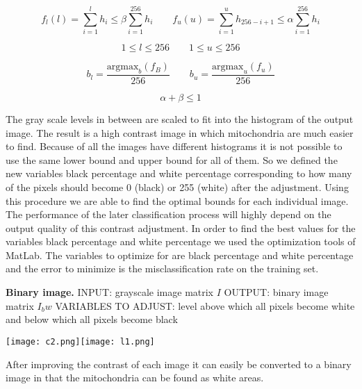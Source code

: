 \documentclass[a4paper, 11pt]{article}
\begin{document}
\begin{equation}
	f_l(l)=\sum_{i=1}^{l}h_i\leq\beta\sum_{i=1}^{256}h_i \qquad f_u(u)=\sum_{i=1}^{u}h_{256-i+1}\leq\alpha\sum_{i=1}^{256}h_i
\end{equation}

\begin{equation}
	1 \leq l \leq 256 \qquad 1 \leq u \leq 256
\end{equation}

\begin{equation}
	b_l=\frac{\mbox{argmax}_b(f_B)}{256} \qquad b_u=\frac{\mbox{argmax}_u(f_u)}{256}
\end{equation}

\begin{equation}
	\alpha + \beta \leq 1
\end{equation}

The gray scale levels in between are scaled to fit into the histogram of the output image. The result is a high contrast image in which mitochondria are much easier to find.
Because of all the images have different histograms it is not possible to use the same lower bound and upper bound for all of them. So we defined the new variables black percentage and white percentage corresponding to how many of the pixels should become 0 (black) or 255 (white) after the adjustment. Using this procedure we are able to find the optimal bounds for each individual image. The performance of the later classification process will highly depend on the output quality of this contrast adjustment. In order to find the best values for the variables black percentage and white percentage we used the optimization tools of MatLab. The variables to optimize for are black percentage and white percentage and the error to minimize is the misclassification rate on the training set. 
\newline
\newline

\textbf{Binary image.} 
\newline
\newline
INPUT: grayscale image matrix $I$
\newline
OUTPUT: binary image matrix $I_bw$
\newline
VARIABLES TO ADJUST: level above which all pixels become white and below which all pixels become black
\newline
\newline
\begin{center}\texttt{[image: c2.png]}\texttt{[image: l1.png]}
\end{center}
After improving the contrast of each image it can easily be converted to a binary image in that the mitochondria can be found as white areas.
\newline
\newline
\end{document}
